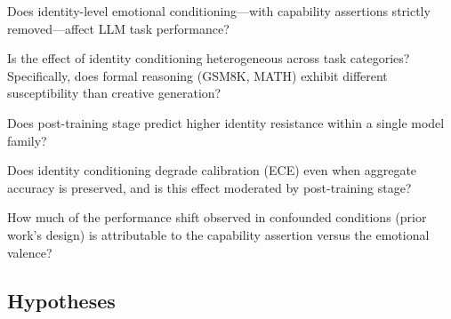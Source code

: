 \documentclass[11pt,a4paper]{article}
\begin{document}
\begin{description}[leftmargin=1em,style=nextline]
  \item[\textbf{RQ1.}] Does identity-level emotional conditioning—with capability assertions strictly removed—affect LLM task performance?
  \item[\textbf{RQ2.}] Is the effect of identity conditioning heterogeneous across task categories? Specifically, does formal reasoning (GSM8K, MATH) exhibit different susceptibility than creative generation?
  \item[\textbf{RQ3.}] Does post-training stage predict higher identity resistance within a single model family?
  \item[\textbf{RQ4.}] Does identity conditioning degrade calibration (ECE) even when aggregate accuracy is preserved, and is this effect moderated by post-training stage?
  \item[\textbf{RQ5.}] How much of the performance shift observed in confounded conditions (prior work's design) is attributable to the capability assertion versus the emotional valence?
\end{description}

\subsection{Hypotheses}
\end{document}
